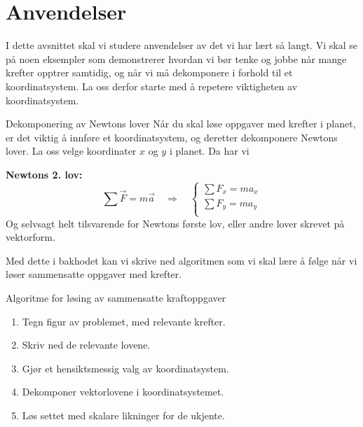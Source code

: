 \section{Anvendelser}
I dette avsnittet skal vi studere anvendelser av det vi har lært så langt. Vi skal se på noen eksempler som demonstrerer hvordan vi bør tenke og jobbe når mange krefter opptrer samtidig, og når vi må dekomponere i forhold til et koordinatsystem. La oss derfor starte med å repetere viktigheten av koordinatsystem.

\begin{myoppsum*}{Dekomponering av Newtons lover}
Når du skal løse oppgaver med krefter i planet, er det viktig å innføre et koordinatsystem, og deretter dekomponere Newtons lover. La oss velge koordinater $x$ og $y$ i planet. Da har vi

\medskip
\textbf{Newtons 2. lov:}
\[
  \sum\vec{F} = m\vec{a}\quad\Longrightarrow\quad
  \begin{cases}
    \sum F_x = m a_x\\[5pt]
    \sum F_y = m a_y\\[5pt]
  \end{cases}
\]
Og selvsagt helt tilsvarende for Newtons første lov, eller andre lover skrevet på vektorform.
\end{myoppsum*}
Med dette i bakhodet kan vi skrive ned algoritmen som vi skal lære å følge når vi løser sammensatte oppgaver med krefter.
\begin{myoppsum*}{Algoritme for løsing av sammensatte kraftoppgaver}
\begin{enumerate}
    \item Tegn figur av problemet, med relevante krefter.
    \item Skriv ned de relevante lovene.
    \item Gjør et hensiktsmessig valg av koordinatsystem.
    \item Dekomponer vektorlovene i koordinatsystemet.
    \item Løs settet med skalare likninger for de ukjente. 
\end{enumerate}
\end{myoppsum*}

